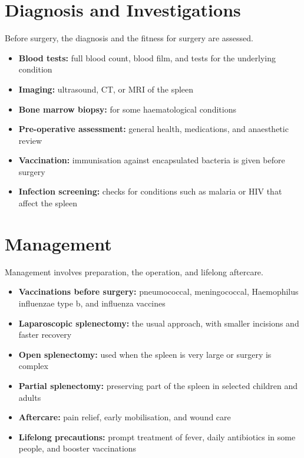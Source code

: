 \section*{Diagnosis and Investigations}
Before surgery, the diagnosis and the fitness for surgery are assessed.
\begin{itemize}
    \item \textbf{Blood tests:} full blood count, blood film, and tests for the underlying condition
    \item \textbf{Imaging:} ultrasound, CT, or MRI of the spleen
    \item \textbf{Bone marrow biopsy:} for some haematological conditions
    \item \textbf{Pre-operative assessment:} general health, medications, and anaesthetic review
    \item \textbf{Vaccination:} immunisation against encapsulated bacteria is given before surgery
    \item \textbf{Infection screening:} checks for conditions such as malaria or HIV that affect the spleen
\end{itemize}

\section*{Management}
Management involves preparation, the operation, and lifelong aftercare.
\begin{itemize}
    \item \textbf{Vaccinations before surgery:} pneumococcal, meningococcal, Haemophilus influenzae type b, and influenza vaccines
    \item \textbf{Laparoscopic splenectomy:} the usual approach, with smaller incisions and faster recovery
    \item \textbf{Open splenectomy:} used when the spleen is very large or surgery is complex
    \item \textbf{Partial splenectomy:} preserving part of the spleen in selected children and adults
    \item \textbf{Aftercare:} pain relief, early mobilisation, and wound care
    \item \textbf{Lifelong precautions:} prompt treatment of fever, daily antibiotics in some people, and booster vaccinations
\end{itemize}

